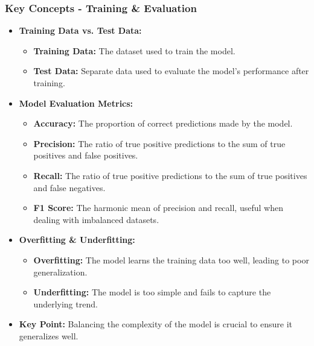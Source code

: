 \documentclass{beamer}
\begin{document}
\begin{frame}[fragile]
    \frametitle{Key Concepts - Training & Evaluation}
    \begin{itemize}
        \item \textbf{Training Data vs. Test Data:}
        \begin{itemize}
            \item \textbf{Training Data:} The dataset used to train the model.
            \item \textbf{Test Data:} Separate data used to evaluate the model's performance after training.
        \end{itemize}

        \item \textbf{Model Evaluation Metrics:}
        \begin{itemize}
            \item \textbf{Accuracy:} The proportion of correct predictions made by the model.
            \item \textbf{Precision:} The ratio of true positive predictions to the sum of true positives and false positives.
            \item \textbf{Recall:} The ratio of true positive predictions to the sum of true positives and false negatives.
            \item \textbf{F1 Score:} The harmonic mean of precision and recall, useful when dealing with imbalanced datasets.
        \end{itemize}
        
        \item \textbf{Overfitting \& Underfitting:}
        \begin{itemize}
            \item \textbf{Overfitting:} The model learns the training data too well, leading to poor generalization.
            \item \textbf{Underfitting:} The model is too simple and fails to capture the underlying trend.
        \end{itemize}
        \item \textbf{Key Point:} Balancing the complexity of the model is crucial to ensure it generalizes well.
    \end{itemize}
\end{frame}
\end{document}
